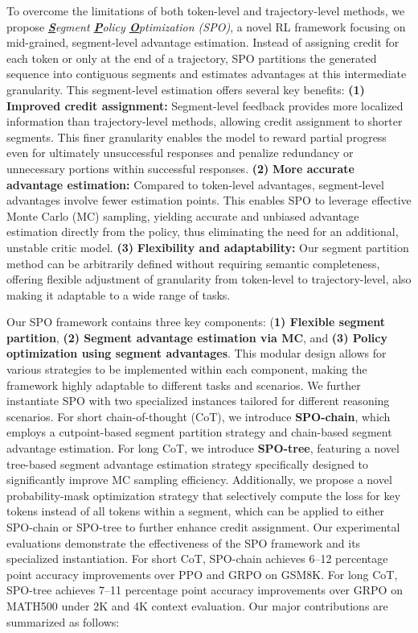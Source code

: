 To overcome the limitations of both token-level and trajectory-level methods, we propose \emph{\underline{\textbf{S}}egment \underline{\textbf{P}}olicy \underline{\textbf{O}}ptimization (SPO)}, a novel RL framework focusing on mid-grained, segment-level advantage estimation. Instead of assigning credit for each token or only at the end of a trajectory, SPO partitions the generated sequence into contiguous segments and estimates advantages at this intermediate granularity. This segment-level estimation offers several key benefits: \textbf{(1)} \textbf{Improved credit assignment:} Segment-level feedback provides more localized information than trajectory-level methods, allowing credit assignment to shorter segments. This finer granularity enables the model to reward partial progress even for ultimately unsuccessful responses and penalize redundancy or unnecessary portions within successful responses. \textbf{(2)} \textbf{More accurate advantage estimation:} Compared to token-level advantages, segment-level advantages involve fewer estimation points. This enables SPO to leverage effective Monte Carlo (MC) sampling, yielding accurate and unbiased advantage estimation directly from the policy, thus eliminating the need for an additional, unstable critic model. \textbf{(3)} \textbf{Flexibility and adaptability:} Our segment partition method can be arbitrarily defined without requiring semantic completeness, offering flexible adjustment of granularity from token-level to trajectory-level, also making it adaptable to a wide range of tasks.

Our SPO framework contains three key components: (\textbf{1) Flexible segment partition}, \textbf{(2) Segment advantage estimation via MC}, and \textbf{(3) Policy optimization using segment advantages}. This modular design allows for various strategies to be implemented within each component, making the framework highly adaptable to different tasks and scenarios. We further instantiate SPO with two specialized instances tailored for different reasoning scenarios. For short chain-of-thought (CoT), we introduce \textbf{SPO-chain}, which employs a cutpoint-based segment partition strategy and chain-based segment advantage estimation. For long CoT, we introduce \textbf{SPO-tree}, featuring a novel tree-based segment advantage estimation strategy specifically designed to significantly improve MC sampling efficiency. Additionally, we propose a novel probability-mask optimization strategy that selectively compute the loss for key tokens instead of all tokens within a segment, which can be applied to either SPO-chain or SPO-tree to further enhance credit assignment. Our experimental evaluations demonstrate the effectiveness of the SPO framework and its specialized instantiation. For short CoT, SPO-chain achieves 6–12 percentage point accuracy improvements over PPO and GRPO on GSM8K. For long CoT, SPO-tree achieves 7–11 percentage point accuracy improvements over GRPO on MATH500 under 2K and 4K context evaluation. Our major contributions are summarized as follows:

